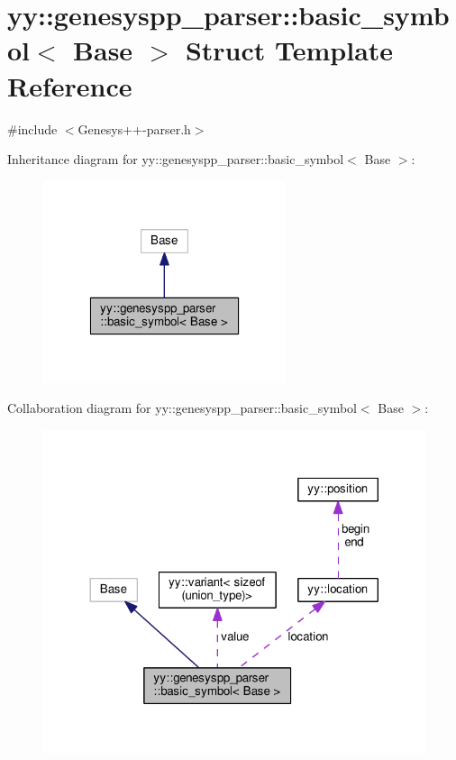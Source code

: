 \hypertarget{structyy_1_1genesyspp__parser_1_1basic__symbol}{\section{yy\-:\-:genesyspp\-\_\-parser\-:\-:basic\-\_\-symbol$<$ Base $>$ Struct Template Reference}
\label{structyy_1_1genesyspp__parser_1_1basic__symbol}
}


{\ttfamily \#include $<$Genesys++-\/parser.\-h$>$}



Inheritance diagram for yy\-:\-:genesyspp\-\_\-parser\-:\-:basic\-\_\-symbol$<$ Base $>$\-:\nopagebreak
\begin{figure}[H]
\begin{center}
\leavevmode
\includegraphics[width=202pt]{structyy_1_1genesyspp__parser_1_1basic__symbol__inherit__graph}
\end{center}
\end{figure}


Collaboration diagram for yy\-:\-:genesyspp\-\_\-parser\-:\-:basic\-\_\-symbol$<$ Base $>$\-:\nopagebreak
\begin{figure}[H]
\begin{center}
\leavevmode
\includegraphics[width=320pt]{structyy_1_1genesyspp__parser_1_1basic__symbol__coll__graph}
\end{center}
\end{figure}
